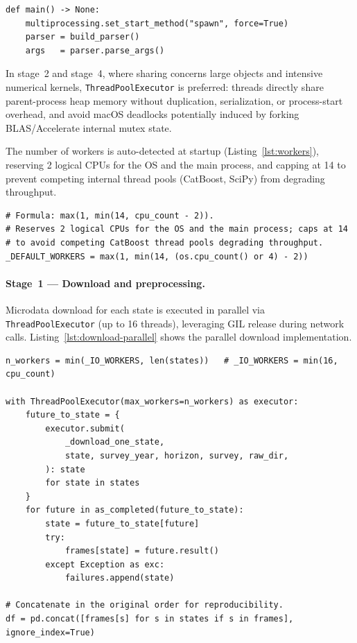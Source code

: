 \begin{lstlisting}[style=pipeline,caption={Explicit \texttt{spawn} start method enforcement (\texttt{src/main.py}).},label={lst:spawn-method}]
def main() -> None:
    multiprocessing.set_start_method("spawn", force=True)
    parser = build_parser()
    args   = parser.parse_args()
\end{lstlisting}

In stage~2 and stage~4, where sharing concerns large objects and intensive numerical kernels, \texttt{ThreadPoolExecutor} is preferred: threads directly share parent-process heap memory without duplication, serialization, or process-start overhead, and avoid macOS deadlocks potentially induced by forking BLAS/Accelerate internal mutex state.

The number of workers is auto-detected at startup (Listing~\ref{lst:workers}), reserving 2 logical CPUs for the OS and the main process, and capping at 14 to prevent competing internal thread pools (CatBoost, SciPy) from degrading throughput.

\begin{lstlisting}[style=pipeline,caption={Worker count auto-detection (\texttt{src/main.py}).},label={lst:workers}]
# Formula: max(1, min(14, cpu_count - 2)).
# Reserves 2 logical CPUs for the OS and the main process; caps at 14
# to avoid competing CatBoost thread pools degrading throughput.
_DEFAULT_WORKERS = max(1, min(14, (os.cpu_count() or 4) - 2))
\end{lstlisting}

\paragraph{Stage~1 --- Download and preprocessing.}\fussy
Microdata download for each state is executed in parallel via \texttt{ThreadPoolExecutor} (up to 16 threads), leveraging GIL release during network calls.
Listing~\ref{lst:download-parallel} shows the parallel download implementation.

\begin{lstlisting}[style=pipeline,caption={Parallel per-state download via \texttt{ThreadPoolExecutor} (\texttt{src/create\_dataset.py}).},label={lst:download-parallel}]
n_workers = min(_IO_WORKERS, len(states))   # _IO_WORKERS = min(16, cpu_count)

with ThreadPoolExecutor(max_workers=n_workers) as executor:
    future_to_state = {
        executor.submit(
            _download_one_state,
            state, survey_year, horizon, survey, raw_dir,
        ): state
        for state in states
    }
    for future in as_completed(future_to_state):
        state = future_to_state[future]
        try:
            frames[state] = future.result()
        except Exception as exc:
            failures.append(state)

# Concatenate in the original order for reproducibility.
df = pd.concat([frames[s] for s in states if s in frames], ignore_index=True)
\end{lstlisting}

